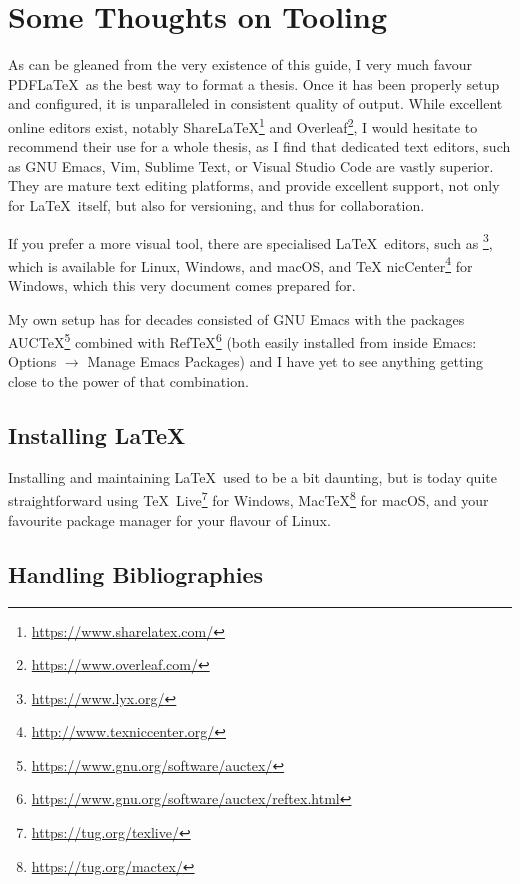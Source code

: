 
\chapter*{Some Thoughts on Tooling}
\label{cha:some-thoughts-tool}


As can be gleaned from the very existence of this guide, I very much
favour PDF\LaTeX\ as the best way to format a thesis. Once it has been
properly setup and configured, it is unparalleled in consistent
quality of output.  While excellent online editors exist, notably
Share\LaTeX\footnote{\url{https://www.sharelatex.com/}} and
Overleaf\footnote{\url{https://www.overleaf.com/}}, I would hesitate
to recommend their use for a whole thesis, as I find that dedicated
text editors, such as GNU Emacs, Vim, Sublime Text, or Visual Studio
Code are vastly superior.  They are mature text editing platforms, and
provide excellent support, not only for \LaTeX\ itself, but also for
versioning, and thus for collaboration.

If you prefer a more visual tool, there are specialised \LaTeX\
editors, such as \mLyX\footnote{\url{https://www.lyx.org/}}, which is
available for Linux, Windows, and macOS, and \TeX
nicCenter\footnote{\url{http://www.texniccenter.org/}} for Windows,
which this very document comes prepared for.

My own setup has for decades consisted of GNU Emacs with the packages
AUC\TeX\footnote{\url{https://www.gnu.org/software/auctex/}} combined
with
Ref\TeX\footnote{\url{https://www.gnu.org/software/auctex/reftex.html}}
(both easily installed from inside Emacs: Options $\rightarrow$ Manage
Emacs Packages) and I have yet to see anything getting close to the
power of that combination.

\section*{Installing \LaTeX}
\label{sec:installing-latex}

Installing and maintaining \LaTeX\ used to be a bit daunting, but is today
quite straightforward using \TeX\
Live\footnote{\url{https://tug.org/texlive/}} for Windows,
Mac\TeX\footnote{\url{https://tug.org/mactex/}} for mac\-OS, and your
favourite package manager for your flavour of Linux.

\section*{Handling Bibliographies}
\label{sec:handl-bibl}

